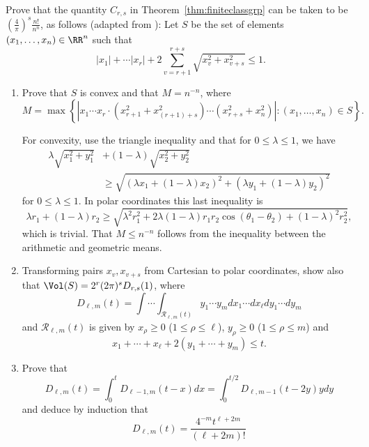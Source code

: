 \begin{exercise}\label{ex:canchooseSright}
	Prove that the quantity $C_{r,s}$ in Theorem~\ref{thm:finiteclassgrp}
	can be taken to be $\left(\frac{4}{\pi}\right)^{s} \frac{n!}{n^n}$,
	as follows (adapted from \cite[pg.~19]{sd:brief}):
	Let $S$ be the set of elements $(x_1,\dots, x_{n})\in\RR^n$ such that
	$$
	|x_1| + \cdots |x_{r}| +
	2 \sum_{v=r+1}^{r+s} \sqrt{x_v^2 + x_{v+s}^2} \leq 1.
	$$
	\begin{enumerate}[label=(\alph*)]
		\item Prove that $S$ is convex and that $M=n^{-n}$, where
		$$
		M = \max\left\{
		\left|x_1 \cdots x_r
		\cdot (x_{r+1}^2 + x_{(r+1)+s}^2) \cdots (x_{r+s}^2 + x_n^2)\right|
		\colon (x_1,\dots, x_n) \in S
		\right\}.
		$$

		\begin{hint}
			For convexity, use the triangle inequality and that for
			$0\leq \lambda \leq 1$, we have
			\begin{align*}
			\lambda\sqrt{x_1^2 + y_1^2} &+ (1-\lambda)\sqrt{x_2^2+y_2^2} \\
			&\geq\sqrt{(\lambda x_1 + (1 - \lambda)x_2)^2
				+ (\lambda y_1 + (1 - \lambda)y_2)^2}
			\end{align*}
			for $0\leq \lambda \leq 1$.  In polar coordinates this last inequality
			is
			$$
			\lambda r_1 + (1-\lambda)r_2 \geq  \sqrt{
				\lambda^2 r_1^2
				+ 2\lambda(1 - \lambda) r_1 r_2 \cos(\theta_1 - \theta_2)
				+ (1 - \lambda)^2 r_2^2
			},
			$$
			which is trivial.  That $M\leq n^{-n}$ follows from the inequality
			between the arithmetic and geometric means.
		\end{hint}
		\item Transforming pairs $x_v, x_{v+s}$ from Cartesian to polar coordinates,
		show also that $\Vol(S) = 2^{r}(2\pi)^s D_{r,s}(1)$, where
		$$
		D_{\ell,m}(t) = \int \cdots \int_{\mathcal{R}_{\ell,m}(t)}
		y_1 \cdots y_m dx_1 \cdots dx_{\ell} dy_1 \cdots dy_m
		$$
		and
		$\mathcal{R}_{\ell,m}(t)$ is given by $x_{\rho}\geq 0$
		($1\leq \rho\leq \ell$), $y_{\rho}\geq 0$ ($1\leq \rho\leq m$) and
		$$
		x_1 + \cdots + x_{\ell} + 2(y_1+\cdots +y_m) \leq t.
		$$
		\item Prove that
		$$
		D_{\ell,m}(t) = \int_{0}^t D_{\ell-1,m}(t-x)dx
		= \int_{0}^{t/2} D_{\ell,m-1}(t-2y)y dy
		$$
		and deduce by induction that
		$$
		D_{\ell,m}(t) = \frac{4^{-m}t^{\ell+2m}}{(\ell+2m)!}
		$$
	\end{enumerate}
\end{exercise}

